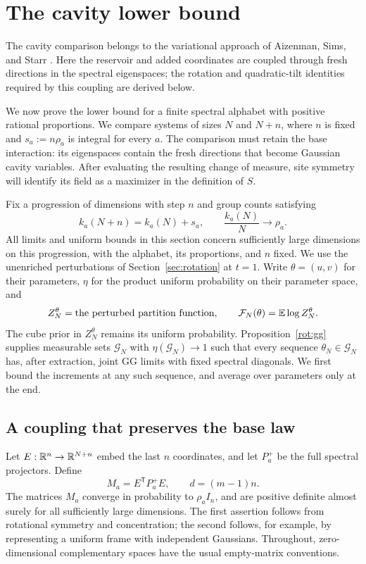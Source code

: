 \section{The cavity lower bound}\label{sec:cavity}

The cavity comparison belongs to the variational approach of
Aizenman, Sims, and Starr \cite{ASS2003}. Here the reservoir and added
coordinates are coupled through fresh directions in the spectral
eigenspaces; the rotation and quadratic-tilt identities required by this
coupling are derived below.

We now prove the lower bound for a finite spectral alphabet with positive
rational proportions.  We compare systems of sizes $N$ and $N+n$, where
$n$ is fixed and $s_a:=n\rho_a$ is integral for every $a$.  The comparison
must retain the base interaction: its eigenspaces contain the fresh
directions that become Gaussian cavity variables.  After evaluating the
resulting change of measure, site symmetry will identify its field as a
maximizer in the definition of $S$.

Fix a progression of dimensions with step $n$ and group counts satisfying
\begin{equation}\label{cav:counts}
 k_a(N+n)=k_a(N)+s_a,
 \qquad \frac{k_a(N)}{N}\longrightarrow\rho_a.
\end{equation}
All limits and uniform bounds in this section concern sufficiently large
dimensions on this progression, with the alphabet, its proportions, and
$n$ fixed.  We use the unenriched perturbations of Section~\ref{sec:rotation}
at $t=1$.  Write $\theta=(u,v)$ for their parameters, $\eta$ for the
product uniform probability on their parameter space, and
\[
 Z_N^\theta=\text{the perturbed partition function},\qquad
 \mathcal F_N(\theta)=\mathbb E\log Z_N^\theta.
\]
The cube prior in $Z_N^\theta$ remains its uniform probability.
Proposition~\ref{rot:gg} supplies measurable sets $\mathcal G_N$ with
$\eta(\mathcal G_N)\to1$ such that every sequence
$\theta_N\in\mathcal G_N$ has, after extraction, joint GG limits with
fixed spectral diagonals.  We first bound the increments at any such
sequence, and average over parameters only at the end.

\subsection{A coupling that preserves the base law}

Let $E:\mathbb R^n\to\mathbb R^{N+n}$ embed the last $n$ coordinates, and let
$P_a^+$ be the full spectral projectors.  Define
\[
 M_a=E^{\mathsf T}P_a^+E,\qquad
 d=(m-1)n.
\]
The matrices $M_a$ converge in probability to $\rho_a I_n$, and are
positive definite almost surely for all sufficiently large dimensions.
The first assertion follows from rotational symmetry and concentration;
the second follows, for example, by representing a uniform frame with
independent Gaussians.  Throughout, zero-dimensional complementary
spaces have the usual empty-matrix conventions.

